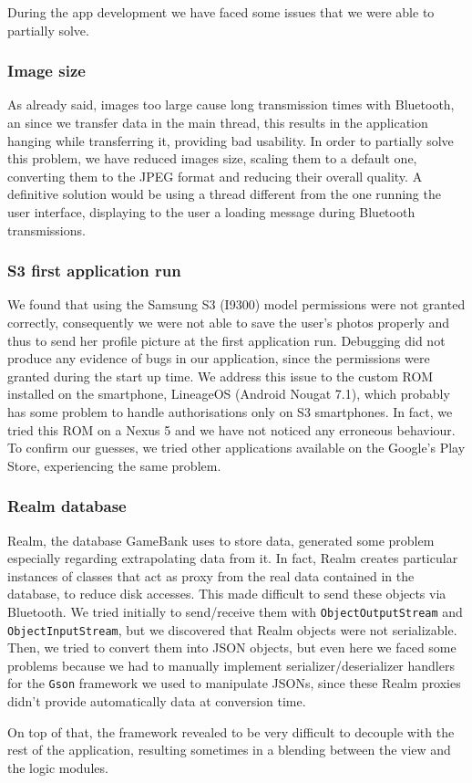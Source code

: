 During the app development we have faced some issues that we were able to 
partially solve.

\subsubsection{Image size}

As already said, images too large cause long transmission times with Bluetooth, 
an since we transfer data  in the main thread, this results in the application 
hanging while transferring it, providing bad usability. In order to partially 
solve this problem, we have reduced images size, scaling them to a default 
one, converting them to the JPEG format and reducing their overall quality. A 
definitive solution would be using a thread different from the one running the 
user interface, displaying to the user a loading message during Bluetooth 
transmissions.

\subsubsection{S3 first application run}

We found that using the Samsung S3 (I9300) model permissions were not granted 
correctly, consequently we were not able to save the user's photos properly and 
thus to send her profile picture at the first application run. Debugging did 
not produce any evidence of bugs in our application, since the permissions 
were granted during the start up time.
We address this issue to the custom ROM installed on the smartphone, LineageOS 
(Android Nougat 7.1), which probably has some problem to handle authorisations 
only on S3 smartphones. In fact, we tried this ROM on a Nexus 5 and we have not 
noticed any erroneous behaviour. To confirm our guesses, we tried other 
applications available on the Google's Play Store, experiencing the same 
problem.

\subsubsection{Realm database}

Realm, the database GameBank uses to store data, generated some problem 
especially regarding extrapolating data from it. In fact, Realm creates 
particular instances of classes that act as proxy from the real data contained 
in the database, to reduce disk accesses. This made difficult to send these  
objects via Bluetooth. We tried initially to send/receive them with 
\texttt{ObjectOutputStream} and \texttt{ObjectInputStream}, but we discovered 
that Realm objects were not serializable. Then, we tried to convert them into 
JSON objects, but even here we faced some problems because we had to manually 
implement serializer/deserializer handlers for the \texttt{Gson} framework we 
used to manipulate JSONs, since these Realm proxies didn't provide 
automatically data at conversion time.

On top of that, the framework revealed to be very difficult to decouple with the 
rest of the application, resulting sometimes in a blending between the view and 
the logic modules.
